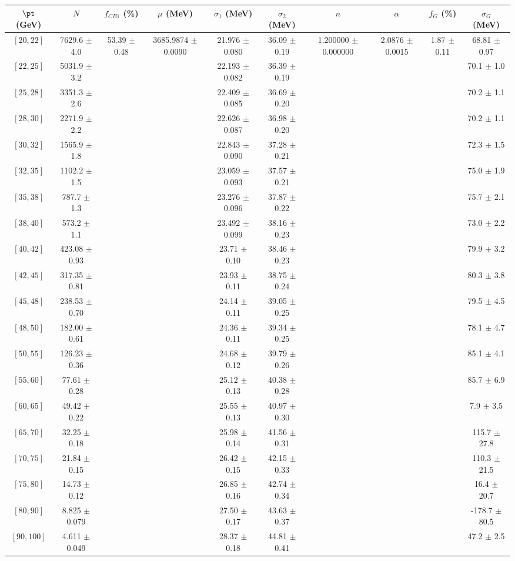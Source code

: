 \begin{tabular}{c||c|c|c|c|c|c|c|c|c}
$\pt$ (GeV) & $N$ & $f_{CB1}$ (\%)  & $\mu$ (MeV) & $\sigma_1$ (MeV) & $\sigma_2$ (MeV) & $n$ & $\alpha$ & $f_G$ (\%) & $\sigma_G$ (MeV) \\
\hline
$[20, 22]$ & 7629.6 $\pm$ 4.0 & \multirow{20}{*}{53.39 $\pm$ 0.48} & \multirow{20}{*}{3685.9874 $\pm$ 0.0090} & 21.976 $\pm$ 0.080 & 36.09 $\pm$ 0.19 & \multirow{20}{*}{1.200000 $\pm$ 0.000000} & \multirow{20}{*}{2.0876 $\pm$ 0.0015} & \multirow{20}{*}{1.87 $\pm$ 0.11} & 68.81 $\pm$ 0.97\\
$[22, 25]$ & 5031.9 $\pm$ 3.2 &  &  & 22.193 $\pm$ 0.082 & 36.39 $\pm$ 0.19 &  &  &  & 70.1 $\pm$ 1.0\\
$[25, 28]$ & 3351.3 $\pm$ 2.6 &  &  & 22.409 $\pm$ 0.085 & 36.69 $\pm$ 0.20 &  &  &  & 70.2 $\pm$ 1.1\\
$[28, 30]$ & 2271.9 $\pm$ 2.2 &  &  & 22.626 $\pm$ 0.087 & 36.98 $\pm$ 0.20 &  &  &  & 70.2 $\pm$ 1.1\\
$[30, 32]$ & 1565.9 $\pm$ 1.8 &  &  & 22.843 $\pm$ 0.090 & 37.28 $\pm$ 0.21 &  &  &  & 72.3 $\pm$ 1.5\\
$[32, 35]$ & 1102.2 $\pm$ 1.5 &  &  & 23.059 $\pm$ 0.093 & 37.57 $\pm$ 0.21 &  &  &  & 75.0 $\pm$ 1.9\\
$[35, 38]$ & 787.7 $\pm$ 1.3 &  &  & 23.276 $\pm$ 0.096 & 37.87 $\pm$ 0.22 &  &  &  & 75.7 $\pm$ 2.1\\
$[38, 40]$ & 573.2 $\pm$ 1.1 &  &  & 23.492 $\pm$ 0.099 & 38.16 $\pm$ 0.23 &  &  &  & 73.0 $\pm$ 2.2\\
$[40, 42]$ & 423.08 $\pm$ 0.93 &  &  & 23.71 $\pm$ 0.10 & 38.46 $\pm$ 0.23 &  &  &  & 79.9 $\pm$ 3.2\\
$[42, 45]$ & 317.35 $\pm$ 0.81 &  &  & 23.93 $\pm$ 0.11 & 38.75 $\pm$ 0.24 &  &  &  & 80.3 $\pm$ 3.8\\
$[45, 48]$ & 238.53 $\pm$ 0.70 &  &  & 24.14 $\pm$ 0.11 & 39.05 $\pm$ 0.25 &  &  &  & 79.5 $\pm$ 4.5\\
$[48, 50]$ & 182.00 $\pm$ 0.61 &  &  & 24.36 $\pm$ 0.11 & 39.34 $\pm$ 0.25 &  &  &  & 78.1 $\pm$ 4.7\\
$[50, 55]$ & 126.23 $\pm$ 0.36 &  &  & 24.68 $\pm$ 0.12 & 39.79 $\pm$ 0.26 &  &  &  & 85.1 $\pm$ 4.1\\
$[55, 60]$ & 77.61 $\pm$ 0.28 &  &  & 25.12 $\pm$ 0.13 & 40.38 $\pm$ 0.28 &  &  &  & 85.7 $\pm$ 6.9\\
$[60, 65]$ & 49.42 $\pm$ 0.22 &  &  & 25.55 $\pm$ 0.13 & 40.97 $\pm$ 0.30 &  &  &  & 7.9 $\pm$ 3.5\\
$[65, 70]$ & 32.25 $\pm$ 0.18 &  &  & 25.98 $\pm$ 0.14 & 41.56 $\pm$ 0.31 &  &  &  & 115.7 $\pm$ 27.8\\
$[70, 75]$ & 21.84 $\pm$ 0.15 &  &  & 26.42 $\pm$ 0.15 & 42.15 $\pm$ 0.33 &  &  &  & 110.3 $\pm$ 21.5\\
$[75, 80]$ & 14.73 $\pm$ 0.12 &  &  & 26.85 $\pm$ 0.16 & 42.74 $\pm$ 0.34 &  &  &  & 16.4 $\pm$ 20.7\\
$[80, 90]$ & 8.825 $\pm$ 0.079 &  &  & 27.50 $\pm$ 0.17 & 43.63 $\pm$ 0.37 &  &  &  & -178.7 $\pm$ 80.5\\
$[90, 100]$ & 4.611 $\pm$ 0.049 &  &  & 28.37 $\pm$ 0.18 & 44.81 $\pm$ 0.41 &  &  &  & 47.2 $\pm$ 2.5\\
\end{tabular}
